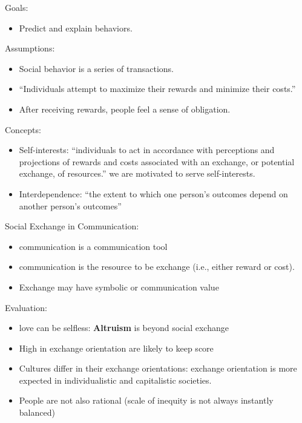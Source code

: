 \documentclass[
]{book}
\providecommand{\tightlist}{%
  \setlength{\itemsep}{0pt}\setlength{\parskip}{0pt}}
\begin{document}
Goals:

\begin{itemize}
\tightlist
\item
  Predict and explain behaviors.
\end{itemize}

Assumptions:

\begin{itemize}
\tightlist
\item
  Social behavior is a series of transactions.
\item
  ``Individuals attempt to maximize their rewards and minimize their costs.''
\item
  After receiving rewards, people feel a sense of obligation.
\end{itemize}

Concepts:

\begin{itemize}
\tightlist
\item
  Self-interests: ``individuals to act in accordance with perceptions and projections of rewards and costs associated
  with an exchange, or potential exchange, of resources.'' we are motivated to serve self-interests.\\
\item
  Interdependence: ``the extent to which one person's outcomes depend on another person's outcomes''
\end{itemize}

Social Exchange in Communication:

\begin{itemize}
\tightlist
\item
  communication is a communication tool
\item
  communication is the resource to be exchange (i.e., either reward or cost).
\item
  Exchange may have symbolic or communication value \citep{Molm_2007}
\end{itemize}

Evaluation:

\begin{itemize}
\tightlist
\item
  love can be selfless: \textbf{Altruism} is beyond social exchange
\item
  High in exchange orientation are likely to keep score \citep{Murstein_1971}
\item
  Cultures differ in their exchange orientations: exchange orientation is more expected in individualistic and
  capitalistic societies. \citep{Van_Yperen_1990}
\item
  People are not also rational (scale of inequity is not always instantly balanced)
\end{itemize}
\end{document}
